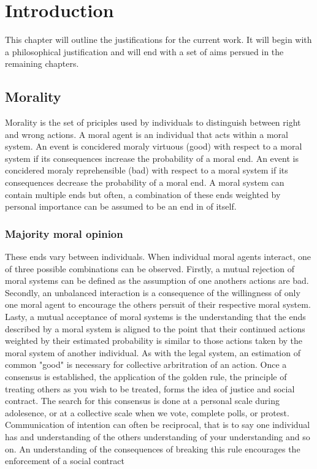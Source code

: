 \chapter{Introduction}
This chapter will outline the justifications for the current work. It will begin with a philosophical justification and will end with a set of aims persued in the remaining chapters.

\section{Morality}
Morality is the set of priciples used by individuals to distinguish between right and wrong actions.
A moral agent is an individual that acts within a moral system.
An event is concidered moraly virtuous (good) with respect to a moral system if its consequences increase the probability of a moral end.
An event is concidered moraly reprehensible (bad) with respect to a moral system if its consequences decrease the probability of a moral end.
A moral system can contain multiple ends but often, a combination of these ends weighted by personal importance can be assumed to be an end in of itself.

\subsection{Majority moral opinion}
These ends vary between individuals.
When individual moral agents interact, one of three possible combinations can be observed.
Firstly, a mutual rejection of moral systems can be defined as the assumption of one anothers actions are bad. 
Secondly, an unbalanced interaction is a consequence of the willingness of only one moral agent to encourage the others persuit of their respective moral system.
Lasty, a mutual acceptance of moral systems is the understanding that the ends described by a moral system is aligned to the point that their continued actions weighted by their estimated probability is similar to those actions taken by the moral system of another individual.
As with the legal system, an estimation of common "good" is necessary for collective arbritration of an action.
Once a consensus is established, the application of the golden rule, the principle of treating others as you wish to be treated, forms the idea of justice and social contract.
The search for this consensus is done at a personal scale during adolesence, or at a collective scale when we vote, complete polls, or protest.
Communication of intention can often be reciprocal, that is to say one individual has and understanding of the others understanding of your understanding and so on.
An understanding of the consequences of breaking this rule encourages the enforcement of a social contract

